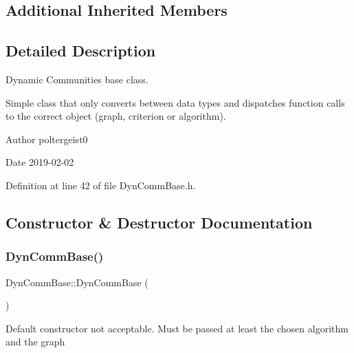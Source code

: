 \subsection*{Additional Inherited Members}


\subsection{Detailed Description}
Dynamic Communities base class. 

Simple class that only converts between data types and dispatches function calls to the correct object (graph, criterion or algorithm).

\begin{DoxyAuthor}{Author}
poltergeist0
\end{DoxyAuthor}
\begin{DoxyDate}{Date}
2019-\/02-\/02 
\end{DoxyDate}


Definition at line 42 of file Dyn\+Comm\+Base.\+h.



\subsection{Constructor \& Destructor Documentation}
\mbox{\label{classDynCommBase_a69682c03778e2f5d6b52c8139b26f454}} 
\subsubsection{\texorpdfstring{Dyn\+Comm\+Base()}{DynCommBase()}\hspace{0.1cm}{\footnotesize\ttfamily [1/2]}}
{\footnotesize\ttfamily Dyn\+Comm\+Base\+::\+Dyn\+Comm\+Base (\begin{DoxyParamCaption}{ }\end{DoxyParamCaption})\hspace{0.3cm}{\ttfamily [delete]}}

Default constructor not acceptable. Must be passed at least the chosen algorithm and the graph \mbox{\label{classDynCommBase_a3dd8b3480d39f8be793d64a312b4da87}} 
